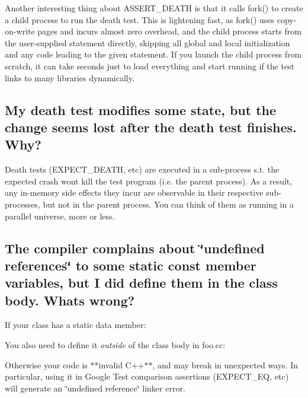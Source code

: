 Another interesting thing about {\ttfamily A\+S\+S\+E\+R\+T\+\_\+\+D\+E\+A\+TH} is that it calls {\ttfamily fork()} to create a child process to run the death test. This is lightening fast, as {\ttfamily fork()} uses copy-\/on-\/write pages and incurs almost zero overhead, and the child process starts from the user-\/supplied statement directly, skipping all global and local initialization and any code leading to the given statement. If you launch the child process from scratch, it can take seconds just to load everything and start running if the test links to many libraries dynamically.

\subsection*{My death test modifies some state, but the change seems lost after the death test finishes. Why?}

Death tests ({\ttfamily E\+X\+P\+E\+C\+T\+\_\+\+D\+E\+A\+TH}, etc) are executed in a sub-\/process s.\+t. the expected crash won\textquotesingle{}t kill the test program (i.\+e. the parent process). As a result, any in-\/memory side effects they incur are observable in their respective sub-\/processes, but not in the parent process. You can think of them as running in a parallel universe, more or less.

\subsection*{The compiler complains about \char`\"{}undefined references\char`\"{} to some static const member variables, but I did define them in the class body. What\textquotesingle{}s wrong?}

If your class has a static data member\+:


\begin{DoxyCode}{0}
\DoxyCodeLine{\};}
\end{DoxyCode}


You also need to define it {\itshape outside} of the class body in {\ttfamily foo.\+cc}\+:


\begin{DoxyCode}{0}
\end{DoxyCode}


Otherwise your code is $\ast$$\ast$invalid C++$\ast$$\ast$, and may break in unexpected ways. In particular, using it in Google Test comparison assertions ({\ttfamily E\+X\+P\+E\+C\+T\+\_\+\+EQ}, etc) will generate an \char`\"{}undefined reference\char`\"{} linker error.

